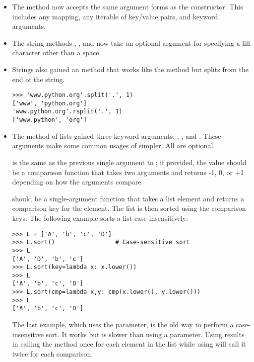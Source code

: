 \documentclass{howto}
\begin{document}
\begin{itemize}

\item The  method now accepts the same
argument forms as the  constructor.  This includes any
mapping, any iterable of key/value pairs, and keyword arguments.       

\item The string methods , , and
 now take an optional argument for specifying a
fill character other than a space.

\item Strings also gained an  method that
works like the  method but splits from the end of
the string.  

\begin{verbatim}
>>> 'www.python.org'.split('.', 1)
['www', 'python.org']
'www.python.org'.rsplit('.', 1)
['www.python', 'org']        
\end{verbatim}      

\item The  method of lists gained three keyword
arguments: , , and .  These arguments
make some common usages of  simpler.  All are optional.

 is the same as the previous single argument to
; if provided, the value should be a comparison
function that takes two arguments and returns -1, 0, or +1 depending
on how the arguments compare.  

 should be a single-argument function that takes a list
element and returns a comparison key for the element.  The list is
then sorted using the comparison keys.  The following example sorts a
list case-insensitively:

\begin{verbatim}
>>> L = ['A', 'b', 'c', 'D']
>>> L.sort()                 # Case-sensitive sort
>>> L
['A', 'D', 'b', 'c']
>>> L.sort(key=lambda x: x.lower())
>>> L
['A', 'b', 'c', 'D']
>>> L.sort(cmp=lambda x,y: cmp(x.lower(), y.lower()))
>>> L
['A', 'b', 'c', 'D']
\end{verbatim}

The last example, which uses the  parameter, is the old way
to perform a case-insensitive sort.  It works but is slower than
using a  parameter.  Using  results in calling the
 method once for each element in the list while using
 will call it twice for each comparison.


\end{itemize}
\end{document}
